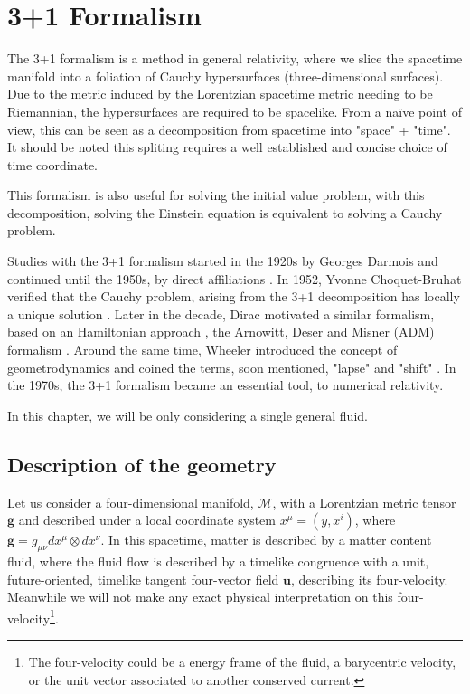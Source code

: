 \chapter{3+1 Formalism}

The 3+1 formalism is a method in general relativity, where we slice the spacetime manifold into a foliation of Cauchy hypersurfaces (three-dimensional surfaces). 
Due to the metric induced by the Lorentzian spacetime metric needing to be Riemannian, the hypersurfaces are required to be spacelike.
From a naïve point of view, this can be seen as a decomposition from spacetime into "space" + "time". It should be noted this spliting requires a well established and concise choice of time coordinate.

This formalism is also useful for solving the initial value problem, with this decomposition, solving the Einstein equation is equivalent to solving a Cauchy problem.

Studies with the 3+1 formalism started in the 1920s by Georges Darmois \cite{Darmois1927} and continued until the 1950s, by direct affiliations \cite{Lichnerowicz_1939}. In 1952, Yvonne Choquet-Bruhat verified that the Cauchy problem, arising from the 3+1 decomposition has locally a unique solution \cite{yvonne1952}.
Later in the decade, Dirac motivated a similar formalism, based on an Hamiltonian approach \cite{dirac_1958,dirac_1959}, the Arnowitt, Deser and Misner (ADM) formalism \cite{Arnowitt_2008}. Around the same time, Wheeler introduced the concept of geometrodynamics and coined the terms, soon mentioned, "lapse" and "shift" \cite{Wheeler1964}. 
In the 1970s, the 3+1 formalism became an essential tool, to numerical relativity.

In this chapter, we will be only considering a single general fluid.

\section{Description of the geometry}

Let us consider a four-dimensional manifold, $\mathcal{M}$, with a Lorentzian metric tensor $\mathbf{g}$ and described under a local coordinate system $x^\mu=(y,x^i)$, where $\mathbf{g}=g_{\mu\nu}dx^\mu \otimes dx^\nu$. 
In this spacetime, matter is described by a matter content fluid, where the fluid flow is described by a timelike congruence with a unit, future-oriented, timelike tangent four-vector field $\mathbf{u}$, describing its four-velocity. 
Meanwhile we will not make any exact physical interpretation on this four-velocity\footnote{The four-velocity could be a energy frame of the fluid, a barycentric velocity, or the unit vector associated to another conserved current.}.

